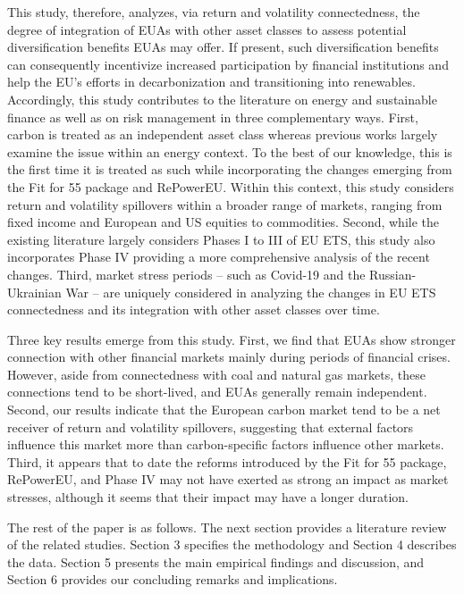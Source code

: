 \documentclass[preprint, 3p,
authoryear]{elsarticle} %
\begin{document}
This study, therefore, analyzes, via return and volatility
connectedness, the degree of integration of EUAs with other asset
classes to assess potential diversification benefits EUAs may offer. If
present, such diversification benefits can consequently incentivize
increased participation by financial institutions and help the EU's
efforts in decarbonization and transitioning into renewables.
Accordingly, this study contributes to the literature on energy and
sustainable finance as well as on risk management in three complementary
ways. First, carbon is treated as an independent asset class whereas
previous works largely examine the issue within an energy context. To
the best of our knowledge, this is the first time it is treated as such
while incorporating the changes emerging from the Fit for 55 package and
RePowerEU. Within this context, this study considers return and
volatility spillovers within a broader range of markets, ranging from
fixed income and European and US equities to commodities. Second, while
the existing literature largely considers Phases I to III of EU ETS,
this study also incorporates Phase IV providing a more comprehensive
analysis of the recent changes. Third, market stress periods -- such as
Covid-19 and the Russian-Ukrainian War -- are uniquely considered in
analyzing the changes in EU ETS connectedness and its integration with
other asset classes over time.

Three key results emerge from this study. First, we find that EUAs show
stronger connection with other financial markets mainly during periods
of financial crises. However, aside from connectedness with coal and
natural gas markets, these connections tend to be short-lived, and EUAs
generally remain independent. Second, our results indicate that the
European carbon market tend to be a net receiver of return and
volatility spillovers, suggesting that external factors influence this
market more than carbon-specific factors influence other markets. Third,
it appears that to date the reforms introduced by the Fit for 55
package, RePowerEU, and Phase IV may not have exerted as strong an
impact as market stresses, although it seems that their impact may have
a longer duration.

The rest of the paper is as follows. The next section provides a
literature review of the related studies. Section 3 specifies the
methodology and Section 4 describes the data. Section 5 presents the
main empirical findings and discussion, and Section 6 provides our
concluding remarks and implications.
\end{document}
